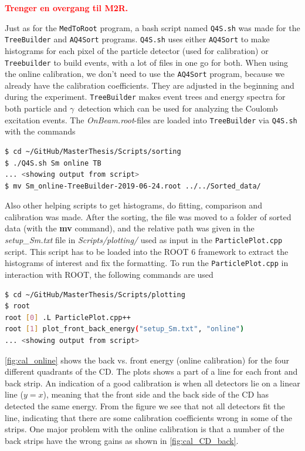 \documentclass[twoside,english]{uiofysmaster/uiofysmaster}
\newcommand{\ga}{$\gamma$}
\begin{document}
\bigskip

\textcolor{red}{\textbf{Trenger en overgang til M2R.}}

\bigskip



Just as for the \texttt{MedToRoot} program, a bash script named \texttt{Q4S.sh} was made for the \texttt{TreeBuilder} and \texttt{AQ4Sort} programs. 
\texttt{Q4S.sh} uses either \texttt{AQ4Sort} to make histograms for each pixel of the particle detector (used for calibration) or \texttt{Treebuilder} to build events, with a lot of files in one go for both. 
When using the online calibration, we don't need to use the \texttt{AQ4Sort} program, because we already have the calibration coefficients. 
They are adjusted in the beginning and during the experiment.
\texttt{TreeBuilder} makes event trees and energy spectra for both particle and \ga\ detection which can be used for analyzing the Coulomb excitation events.
The \textit{OnBeam.root}-files are loaded into \texttt{TreeBuilder} via \texttt{Q4S.sh} with the commands

\begin{lstlisting}[language=sh]
$ cd ~/GitHub/MasterThesis/Scripts/sorting 
$ ./Q4S.sh Sm online TB
... <showing output from script>
$ mv Sm_online-TreeBuilder-2019-06-24.root ../../Sorted_data/
\end{lstlisting}

Also other helping scripts to get histograms, do fitting, comparison and calibration was made. 
After the sorting, the file was moved to a folder of sorted data (with the \textbf{mv} command), and the relative path was given in the \textit{setup\_Sm.txt} file in \textit{Scripts/plotting/} used as input in the \texttt{ParticlePlot.cpp} script. 
This script has to be loaded into the ROOT 6 framework to extract the histograms of interest and fix the formatting.
To run the \texttt{ParticlePlot.cpp} in interaction with ROOT, the following commands are used

\begin{lstlisting}[language=sh]
$ cd ~/GitHub/MasterThesis/Scripts/plotting 
$ root
root [0] .L ParticlePlot.cpp++
root [1] plot_front_back_energy("setup_Sm.txt", "online")
... <showing output from script>
\end{lstlisting}

\autoref{fig:cal_online} shows the back vs. front energy (online calibration) for the four different quadrants of the CD. 
The plots shows a part of a line for each front and back strip. An indication of a good calibration is when all detectors lie on a linear line ($y = x$), meaning that the front side and the back side of the CD has detected the same energy. 
From the figure we see that not all detectors fit the line, indicating that there are some calibration coefficients wrong in some of the strips.
One major problem with the online calibration is that a number of the back strips have the wrong gains as shown in \autoref{fig:cal_CD_back}.
\end{document}
